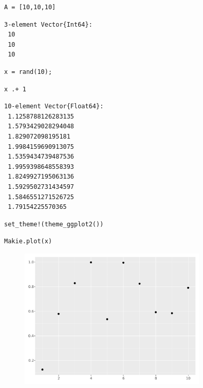 \begin{lstlisting}[language=JuliaLocal, style=julia]
A = [10,10,10]
\end{lstlisting}

\begin{verbatim}
3-element Vector{Int64}:
 10
 10
 10
\end{verbatim}

\begin{lstlisting}[language=JuliaLocal, style=julia]
x = rand(10);
\end{lstlisting}

\begin{lstlisting}[language=JuliaLocal, style=julia]
x .+ 1
\end{lstlisting}

\begin{verbatim}
10-element Vector{Float64}:
 1.1258788126283135
 1.5793429028294048
 1.829072098195181
 1.9984159690913075
 1.5359434739487536
 1.9959398648558393
 1.8249927195063136
 1.5929502731434597
 1.5846551271526725
 1.79154225570365
\end{verbatim}

\begin{lstlisting}[language=JuliaLocal, style=julia]
set_theme!(theme_ggplot2())
\end{lstlisting}

\begin{lstlisting}[language=JuliaLocal, style=julia]
Makie.plot(x)
\end{lstlisting}

\begin{figure}[H]
	\centering
	\includegraphics[width=0.8\textwidth]{./figures/examplepluto_figure2.pdf}
	\label{fig:examplepluto_figure2.pdf}

\end{figure}

